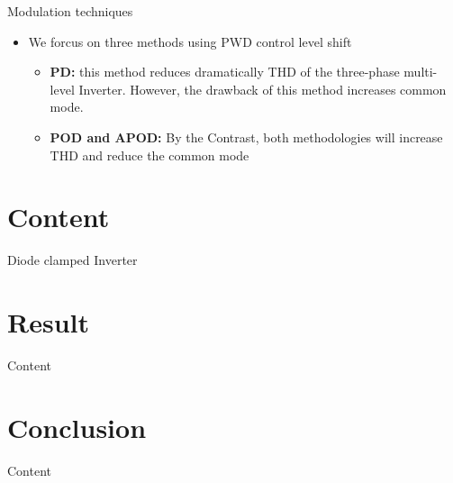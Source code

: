 \documentclass[
	11pt, %
]{beamer}
\begin{document}
\begin{frame}{Modulation techniques}
    \begin{itemize}
		\item {We forcus on three methods using PWD control level shift}
		\begin{itemize}
			\setlength{\itemsep}{10pt}
			\item {\textbf{PD:} this method reduces dramatically THD of the three-phase multi-level Inverter. However, the drawback of this method increases common mode.}
			\item {\textbf{POD and APOD:} By the Contrast, both methodologies will increase THD and reduce the common mode}
		\end{itemize}
	\end{itemize}
\end{frame}






\section{Content}
\begin{frame}{Diode clamped Inverter}
	
\end{frame}



\section{Result}
\begin{frame}{Content}
	
\end{frame}


\section{Conclusion}
\begin{frame}{Content}
	
\end{frame}
\end{document}
